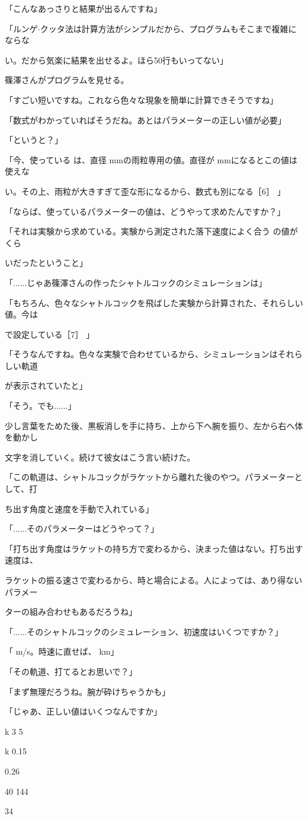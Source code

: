 「こんなあっさりと結果が出るんですね」\par
「ルンゲ$\cdot$クッタ法は計算⽅法がシンプルだから、プログラムもそこまで複雑にならな\par
い。だから気楽に結果を出せるよ。ほら50⾏もいってない」\par
篠澤さんがプログラムを⾒せる。\par
「すごい短いですね。これなら⾊々な現象を簡単に計算できそうですね」\par
「数式がわかっていればそうだね。あとはパラメーターの正しい値が必要」\par
「というと？」\par
「今、使っている は、直径  mmの⾬粒専⽤の値。直径が  mmになるとこの値は使えな\par
い。その上、⾬粒が⼤きすぎて歪な形になるから、数式も別になる［6］ 」\par
「ならば、使っているパラメーターの値は、どうやって求めたんですか？」\par
「それは実験から求めている。実験から測定された落下速度によく合う の値が くら\par
いだったということ」\par
「......じゃあ篠澤さんの作ったシャトルコックのシミュレーションは」\par
「もちろん、⾊々なシャトルコックを⾶ばした実験から計算された、それらしい値。今は\par
で設定している［7］ 」\par
「そうなんですね。⾊々な実験で合わせているから、シミュレーションはそれらしい軌道\par
が表⽰されていたと」\par
「そう。でも......」\par
少し⾔葉をためた後、黒板消しを⼿に持ち、上から下へ腕を振り、左から右へ体を動かし\par
⽂字を消していく。続けて彼⼥はこう⾔い続けた。\par
「この軌道は、シャトルコックがラケットから離れた後のやつ。パラメーターとして、打\par
ち出す⾓度と速度を⼿動で⼊れている」\par
「......そのパラメーターはどうやって？」\par
「打ち出す⾓度はラケットの持ち⽅で変わるから、決まった値はない。打ち出す速度は、\par
ラケットの振る速さで変わるから、時と場合による。⼈によっては、あり得ないパラメー\par
ターの組み合わせもあるだろうね」\par
「......そのシャトルコックのシミュレーション、初速度はいくつですか？」\par
「  m/s。時速に直せば、  km」\par
「その軌道、打てるとお思いで？」\par
「まず無理だろうね。腕が砕けちゃうかも」\par
「じゃあ、正しい値はいくつなんですか」\par
k 3 5\par
k 0.15\par
0.26\par
40 144\par
34\par

